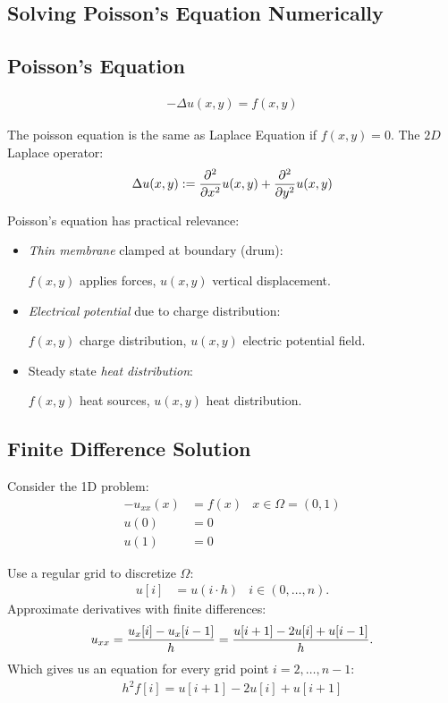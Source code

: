 \begin{multicols}{2}
\section{Solving Poisson's Equation Numerically}
\subsection{Poisson's Equation}
\begin{align*}
	-\Delta u(x,y) = f(x,y)
\end{align*}

The poisson equation is the same as Laplace Equation if $f(x,y) = 0$. The $2D$ Laplace operator:
\begin{align*}
	\Delta u(x,y) := {\partial^2 \over \partial x^2} u(x,y) + {\partial^2 \over \partial y^2} u(x,y)
\end{align*}

Poisson's equation has practical relevance:
\begin{itemize}
	\item \emph{Thin membrane} clamped at boundary (drum):
	
		$f(x,y)$ applies forces, $u(x,y)$ vertical displacement.
	\item \emph{Electrical potential} due to charge distribution:
		
		$f(x,y)$ charge distribution, $u(x,y)$ electric potential field.
		
	\item Steady state \emph{heat distribution}:
	
		$f(x,y)$ heat sources, $u(x,y)$ heat distribution.
\end{itemize}

\subsection{Finite Difference Solution}
Consider the 1D problem:
\begin{align*}
-u_{xx}(x) &= f(x) & x\in \Omega=(0,1)\\
u(0) &= 0\\
u(1) &= 0
\end{align*}

Use a regular grid to discretize $\Omega$:
\begin{align*}
	u[i] &= u(i\cdot h) &i \in (0, \ldots, n).
\end{align*}
Approximate derivatives with finite differences:
\begin{align*}
	u_{xx} = {u_x[i]-u_x[i-1] \over h} =  {u[i+1]-2u[i]+u[i-1] \over h}.
\end{align*}
Which gives us an equation for every grid point $i=2,\ldots, n-1$:
\begin{align*}
	h^2f[i] = u[i+1]-2u[i]+u[i+1]
\end{align*}



\end{multicols}
